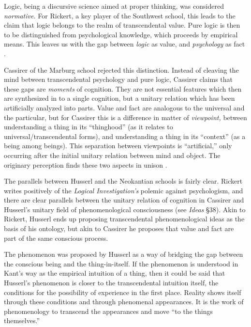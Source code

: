 \documentclass[leqno, 12pt]{turabian-researchpaper}
\begin{document}
	Logic, being a discursive science aimed at proper thinking, was considered \emph{normative.}
	For Rickert, a key player of the Southwest school, this leads to the claim
	that logic belongs to the realm of transcendental value. Pure logic is then to
	be distinguished from psychological knowledge, which proceeds by empirical
	means. This leaves us with the gap between \emph{logic} as value, and \emph{psychology}
	as fact \autocite[34ff]{friedman2000}.

	Cassirer of the Marburg school rejected this distinction. Instead of cleaving the
	mind between transcendental psychology and pure logic, Cassirer claims that
	these gaps are \emph{moments} of cognition. They are not essential features
	which then are synthesized in to a single cognition, but a unitary relation which
	has been artificially analyzed into parts. Value and fact are analogous to the
	universal and the particular, but for Cassirer this is a difference in matter of
	\emph{viewpoint,} between understanding a thing in its \enquote{thinghood} (as
	it relates to universal/transcendental forms), and understanding a thing in
	its \enquote{context} (as a being among beings). This separation between
	viewpoints is \enquote{artificial,} only occurring after the initial unitary relation
	between mind and object. The originary perception finds these two aspects in
	unison \autocite[34ff]{friedman2000}.

	The parallels between Husserl and the Neokantian schools is fairly clear. Rickert
	writes positively of the \textit{Logical Investigation's}\nocite{husserl2005}
	polemic against psychologism, and there are clear parallels between the unitary
	relation of cognition in Cassirer and Husserl's unitary field of phenomenological
	consciousness (see \textit{Ideas} \S38)\nocite{husserl2012}. Akin to Rickert, Husserl
	ends up proposing transcendental phenomenological ideas as the basis of his ontology,
	but akin to Cassirer he proposes that value and fact are part of the same
	conscious process.

	The phenomenon was proposed by Husserl as a way of bridging the gap between
	the conscious being and the thing-in-itself. If the phenomenon is understood in
	Kant's way as the empirical intuition of a thing, then it could be said that
	Husserl's phenomenon is closer to the transcendental intuition itself, the conditions
	for the possibility of experience in the first place. Reality shows itself
	through these conditions and through phenomenal appearances. It is the work of
	phenomenology to transcend the appearances and move \enquote{to the things themselves.}
\end{document}

